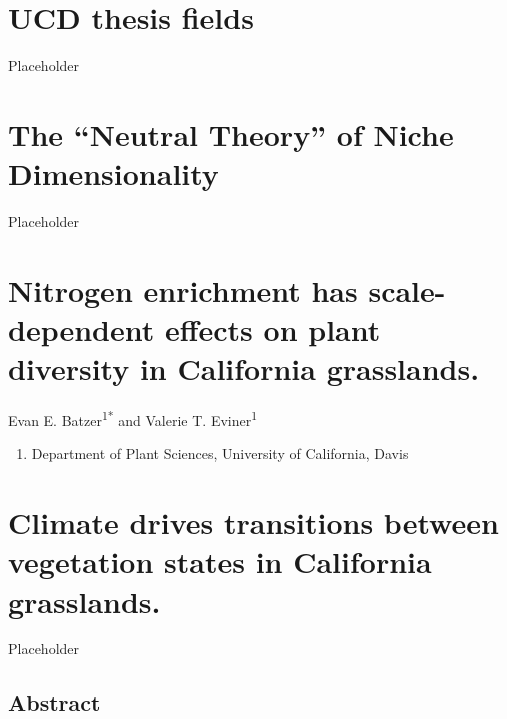 \documentclass[twoside,12pt,final]{ucthesis-CA2012}
\providecommand{\tightlist}{%
  \setlength{\itemsep}{0pt}\setlength{\parskip}{0pt}}
\begin{document}
\begin{ucmainmatter}

\hypertarget{ucd-thesis-fields}{%
\chapter{UCD thesis fields}\label{ucd-thesis-fields}}

Placeholder

\hypertarget{the-neutral-theory-of-niche-dimensionality}{%
\chapter{The ``Neutral Theory'' of Niche Dimensionality}\label{the-neutral-theory-of-niche-dimensionality}}

Placeholder

\hypertarget{nitrogen-enrichment-has-scale-dependent-effects-on-plant-diversity-in-california-grasslands.}{%
\chapter{Nitrogen enrichment has scale-dependent effects on plant diversity in California grasslands.}\label{nitrogen-enrichment-has-scale-dependent-effects-on-plant-diversity-in-california-grasslands.}}


Evan E. Batzer\textsuperscript{1*} and Valerie T. Eviner\textsuperscript{1}
\begin{enumerate}
\def\labelenumi{\arabic{enumi}.}
\tightlist
\item
  Department of Plant Sciences, University of California, Davis
\end{enumerate}
\hypertarget{climate-drives-transitions-between-vegetation-states-in-california-grasslands.}{%
\chapter{Climate drives transitions between vegetation states in California grasslands.}\label{climate-drives-transitions-between-vegetation-states-in-california-grasslands.}}

Placeholder

\hypertarget{abstract}{%
\section{Abstract}\label{abstract}}

\hypertarget{introduction}{%
}
\end{ucmainmatter}
\end{document}

